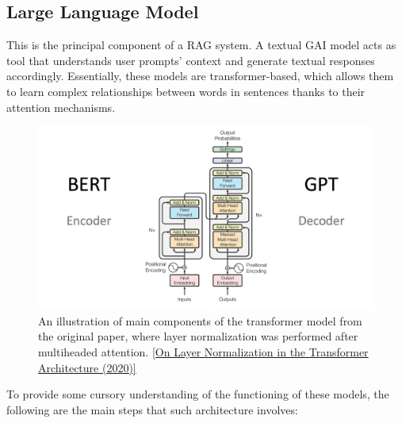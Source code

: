 \subsection{Large Language Model}
This is the principal component of a RAG system. A textual GAI model acts as tool that understands user prompts' context and generate textual responses accordingly. Essentially, these models are transformer-based, which allows them to learn complex relationships between words in sentences thanks to their attention mechanisms.
\begin{figure}[htbp]
    \centering
    \includegraphics[width=\linewidth]{./figures/The-Transformer-model-architecture.png}
    \caption{An illustration of main components of the transformer model from the original paper, where layer normalization was performed after multiheaded attention. \href{https://arxiv.org/abs/2002.04745}{[On Layer Normalization in the Transformer Architecture (2020)]}}
\end{figure}\newline
To provide some cursory understanding of the functioning of these models, the following are the main steps that such architecture involves:
